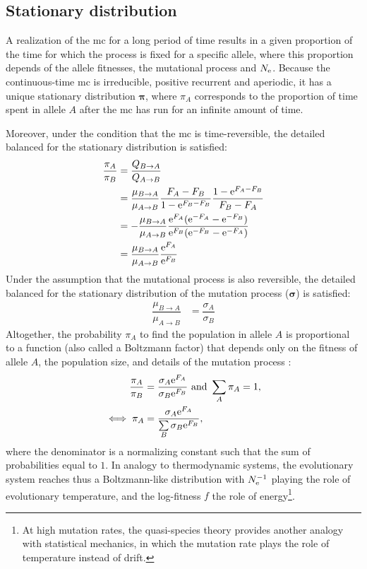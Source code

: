 \subsection{Stationary distribution}

A realization of the \gls{mc} for a long period of time results in a given proportion of the time for which the process is fixed for a specific \gls{allele}, where this proportion depends of the \gls{allele} fitnesses, the mutational process and $N_{\textrm{e}}$.
Because the continuous-time \gls{mc} is irreducible, positive recurrent and aperiodic, it has a unique stationary distribution $\bm{\pi}$, where $\pi_{A}$ corresponds to the proportion of time spent in \gls{allele} $A$ after the \gls{mc} has run for an infinite amount of time. 

Moreover, under the condition that the \gls{mc} is time-reversible, the detailed balanced for the stationary distribution is satisfied:
\begin{align}
\dfrac{\pi_{A}}{\pi_{B}} & = \dfrac{Q_{B \to A}}{Q_{A \to B}} \\
& = \dfrac{\mu_{B \to A}}{\mu_{A \to B}}  \dfrac{F_{A}-F_{B}}{ 1 - \mathrm{e}^{F_{B}-F_{B}}}  \dfrac{1 - \mathrm{e}^{F_{A} - F_{B}} }{F_{B} - F_{A}}\\
& = - \dfrac{\mu_{B \to A}}{\mu_{A \to B}}  \dfrac{ \mathrm{e}^{F_{A}}(\mathrm{e}^{-F_{A}} - \mathrm{e}^{- F_{B}}) }{ \mathrm{e}^{F_{B}}(\mathrm{e}^{-F_{B}} - \mathrm{e}^{- F_{A}})}  \\
& = \dfrac{\mu_{B \to A}}{\mu_{A \to B}} \dfrac{\mathrm{e}^{F_{A}}}{\mathrm{e}^{F_{B}}} \\
\end{align}
Under the assumption that the mutational process is also reversible, the detailed balanced for the stationary distribution of the mutation process ($\bm{\sigma}$) is satisfied:
\begin{align}
\dfrac{\mu_{B \to A}}{\mu_{A \to B}} & = \dfrac{\sigma_{A}}{\sigma_{B}} 
\end{align}
Altogether, the probability $\pi_{A}$ to find the population in \gls{allele} $A$ is proportional to a function (also called a Boltzmann factor) that depends only on the fitness of \gls{allele} $A$, the population size, and details of the mutation process \citep{Sella2005,Mustonen2005}:
\begin{align}
\dfrac{\pi_{A}}{\pi_{B}} & = \dfrac{\sigma_{A}\mathrm{e}^{F_{A}}}{\sigma_{B}\mathrm{e}^{F_{B}}} \text{ and } \sum\limits_{A}\pi_{A} = 1, \\
\iff \pi_{A} & = \dfrac{\sigma_{A}\mathrm{e}^{F_{A}}}{\sum\limits_{B} \sigma_{B}\mathrm{e}^{F_{B}} }, \label{eq:equilibrium-mut-sel}
\end{align}
where the denominator is a normalizing constant such that the sum of probabilities equal to $1$.
In analogy to thermodynamic systems, the evolutionary system reaches thus a Boltzmann-like distribution with $N_{\textrm{e}}^{-1}$ playing the role of evolutionary temperature, and the log-fitness $f$ the role of energy\footnote{At high mutation rates, the quasi-species theory provides another analogy with statistical mechanics, in which the mutation rate plays the role of temperature instead of \gls{drift}.}.

